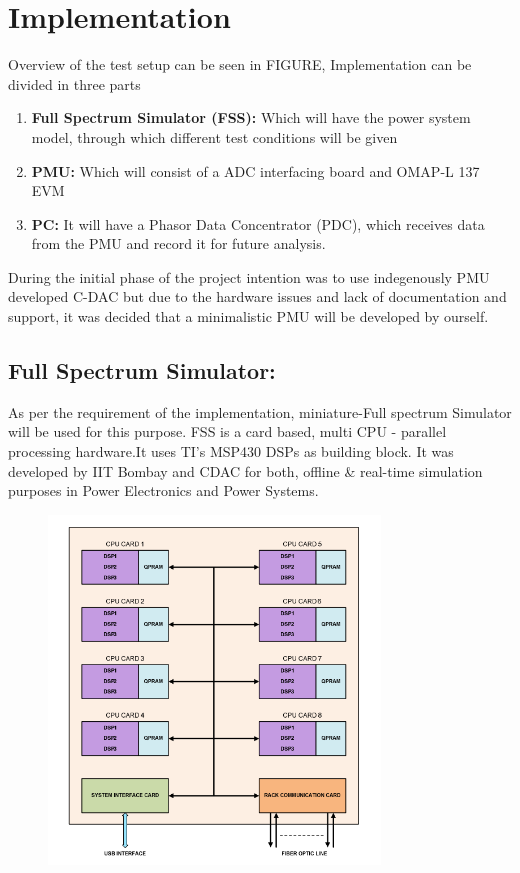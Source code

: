 \section{Implementation}
Overview of the test setup can be seen in FIGURE, Implementation can be divided in three parts
\begin{enumerate}
\item \textbf{Full Spectrum Simulator (FSS):} Which will have the power system model, through which different test conditions will be given
\item \textbf{PMU:} Which will consist of a ADC interfacing board and OMAP-L 137 EVM
\item \textbf{PC:} It will have a Phasor Data Concentrator (PDC), which receives data from the PMU and record it for future analysis.
\end{enumerate}
During the initial phase of the project intention was to use indegenously PMU developed C-DAC but due to the hardware issues and lack of documentation and support, it was decided that a minimalistic PMU will be developed by ourself.

\subsection{Full Spectrum Simulator:}
As per the requirement of the implementation, miniature-Full spectrum Simulator will be used for this purpose. FSS is a card based, multi CPU - parallel processing hardware.It uses TI's MSP430 DSPs as building block. It was developed by IIT Bombay and CDAC for both, offline \& real-time  simulation purposes in Power Electronics and Power Systems.

\begin{figure}[th]
\centering
\includegraphics[width=250pt]{fig/FSS_arch.png}
\end{figure}